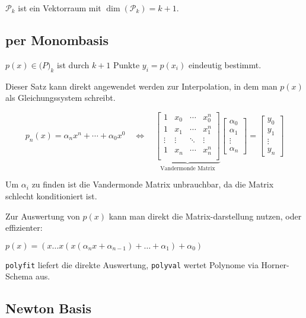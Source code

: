  $\mathcal{P}_k$ ist ein Vektorraum mit $\dim(\mathcal{P}_k) = k+1$.

\subsection{per Monombasis}

 $p(x) \in \mathcal(P)_k$ ist durch $k+1$ Punkte $y_i = p(x_i)$ eindeutig bestimmt.

Dieser Satz kann direkt angewendet werden zur Interpolation, in dem man $p(x)$ als Gleichungssystem schreibt.

$$
p_n(x) = \alpha_n x^n + \cdots + \alpha_0 x^0 \quad \iff \quad 
\underbrace{
    \begin{bmatrix}
    1 & x_0 & \cdots & x_0^n \\
    1 & x_1 & \cdots & x_1^n \\
    \vdots  & \vdots & \ddots & \vdots \\
    1 & x_n & \cdots & x_n^n \\
    \end{bmatrix}
}_\text{Vandermonde Matrix}
\begin{bmatrix}
    \alpha_0 \\
    \alpha_1 \\
    \vdots   \\
    \alpha_n
\end{bmatrix}
=
\begin{bmatrix}
    y_0 \\
    y_1 \\
    \vdots \\
    y_n
\end{bmatrix}
$$

Um $\alpha_i$ zu finden ist die Vandermonde Matrix unbrauchbar, da die Matrix schlecht konditioniert ist.

Zur Auswertung von $p(x)$ kann man direkt die Matrix-darstellung nutzen, oder effizienter:

 $p(x) = (x \ldots x ( x (\alpha_n x + \alpha_{n-1}) + \ldots + \alpha_1) + \alpha_0)$

 \verb|polyfit| liefert die direkte Auswertung, \verb|polyval| wertet Polynome via Horner-Schema aus.

\subsection{Newton Basis}
